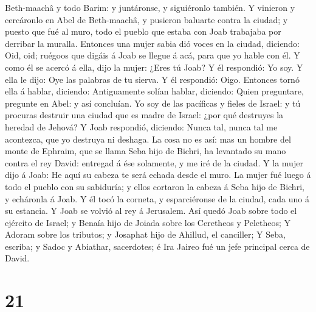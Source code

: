 Beth-maachâ y todo Barim: y juntáronse, y siguiéronlo también.
 Y vinieron y cercáronlo en Abel de Beth-maachâ, y pusieron
baluarte contra la ciudad; y puesto que fué al muro, todo el pueblo que
estaba con Joab trabajaba por derribar la muralla. 
Entonces una mujer sabia dió voces en la ciudad, diciendo: Oid, oid;
ruégoos que digáis á Joab se llegue á acá, para que yo hable con él.
 Y como él se acercó á ella, dijo la mujer: ¿Eres tú Joab?
Y él respondió: Yo soy. Y ella le dijo: Oye las palabras de tu sierva. Y
él respondió: Oigo.  Entonces tornó ella á hablar,
diciendo: Antiguamente solían hablar, diciendo: Quien preguntare,
pregunte en Abel: y así concluían.  Yo soy de las pacíficas
y fieles de Israel: y tú procuras destruir una ciudad que es madre de
Israel: ¿por qué destruyes la heredad de Jehová?  Y Joab
respondió, diciendo: Nunca tal, nunca tal me acontezca, que yo destruya
ni deshaga.  La cosa no es así: mas un hombre del monte de
Ephraim, que se llama Seba hijo de Bichri, ha levantado su mano contra
el rey David: entregad á ése solamente, y me iré de la ciudad. Y la
mujer dijo á Joab: He aquí su cabeza te será echada desde el muro.
 La mujer fué luego á todo el pueblo con su sabiduría; y
ellos cortaron la cabeza á Seba hijo de Bichri, y echáronla á Joab. Y él
tocó la corneta, y esparciéronse de la ciudad, cada uno á su estancia. Y
Joab se volvió al rey á Jerusalem.  Así quedó Joab sobre
todo el ejército de Israel; y Benaía hijo de Joiada sobre los Ceretheos
y Peletheos;  Y Adoram sobre los tributos; y Josaphat hijo
de Ahillud, el canciller;  Y Seba, escriba; y Sadoc y
Abiathar, sacerdotes; é Ira Jaireo fué un jefe principal cerca de David.

\hypertarget{section-20}{%
\section{21}\label{section-20}}

